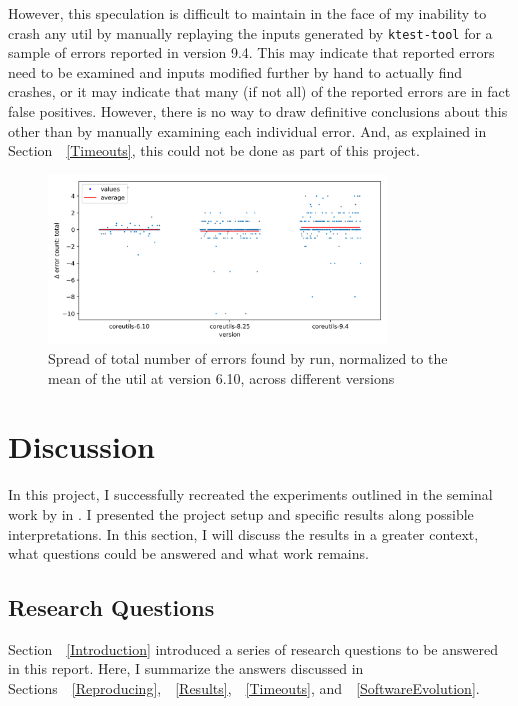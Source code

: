 \documentclass{article}
\let\savedRef=\ref
\renewcommand{\ref}{\unskip~\savedRef}
\begin{document}
However, this speculation is difficult to maintain in the face of my inability to crash any util by manually replaying the inputs generated by \lstinline{ktest-tool} for a sample of errors reported in version 9.4. This may indicate that reported errors need to be examined and inputs modified further by hand to actually find crashes, or it may indicate that many (if not all) of the reported errors are in fact false positives. However, there is no way to draw definitive conclusions about this other than by manually examining each individual error. And, as explained in Section~\ref{Timeouts}, this could not be done as part of this project.

\begin{figure}[htbp]
    \centering
    \includegraphics[width=0.8\textwidth]{../plots/num_errors (total)/changes-by-version.png}
    \captionsetup{width=0.6\textwidth}
    \caption{Spread of total number of errors found by run, normalized to the mean of the util at version 6.10, across different versions}
    \label{fig:spread_across_version_errors}
\end{figure}

\section{Discussion}

In this project, I successfully recreated the experiments outlined in the seminal work by \citeauthor{KLEE} in . I presented the project setup and specific results along possible interpretations. In this section, I will discuss the results in a greater context, what questions could be answered and what work remains.

\subsection{Research Questions}

Section~\ref{Introduction} introduced a series of research questions to be answered in this report. Here, I summarize the answers discussed in Sections~\ref{Reproducing},~\ref{Results},~\ref{Timeouts}, and~\ref{SoftwareEvolution}.
\end{document}
